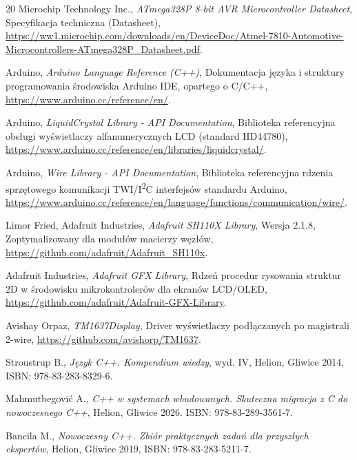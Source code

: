 \documentclass{SGGW-thesis}
\begin{document}
\begin{thebibliography}{20}
  Microchip Technology Inc.,
  \emph{ATmega328P 8-bit AVR Microcontroller Datasheet}, Specyfikacja techniczna (Datasheet), \url{https://ww1.microchip.com/downloads/en/DeviceDoc/Atmel-7810-Automotive-Microcontrollers-ATmega328P_Datasheet.pdf}.
  
  Arduino,
  \emph{Arduino Language Reference (C++)},
  Dokumentacja języka i struktury programowania środowiska Arduino IDE, opartego o C/C++,
  \url{https://www.arduino.cc/reference/en/}.
  
  Arduino,
  \emph{LiquidCrystal Library - API Documentation},
  Biblioteka referencyjna obsługi wyświetlaczy alfanumerycznych LCD (standard HD44780),
  \url{https://www.arduino.cc/reference/en/libraries/liquidcrystal/}.
  
  Arduino,
  \emph{Wire Library - API Documentation},
  Biblioteka referencyjna rdzenia sprzętowego komunikacji TWI/I\textsuperscript{2}C interfejsów standardu Arduino, \url{https://www.arduino.cc/reference/en/language/functions/communication/wire/}.
  
  Limor Fried, Adafruit Industries,
  \emph{Adafruit SH110X Library},
  Wersja 2.1.8, Zoptymalizowany dla modułów macierzy węzłów, \url{https://github.com/adafruit/Adafruit_SH110x}.
  
  Adafruit Industries,
  \emph{Adafruit GFX Library},
  Rdzeń procedur rysowania struktur 2D w środowisku mikrokontrolerów dla ekranów LCD/OLED,
  \url{https://github.com/adafruit/Adafruit-GFX-Library}.
  
  Avishay Orpaz,
  \emph{TM1637Display},
  Driver wyświetlaczy podłączanych po magistrali 2-wire,
  \url{https://github.com/avishorp/TM1637}.

  Stroustrup B.,
  \emph{Język C++. Kompendium wiedzy}, wyd. IV, Helion, Gliwice 2014,
  ISBN: 978-83-283-8329-6.

  Mahmutbegović A.,
  \emph{C++ w systemach wbudowanych. Skuteczna migracja z C do nowoczesnego C++}, Helion, Gliwice 2026.
  ISBN: 978-83-289-3561-7.

  Bancila M.,
  \emph{Nowoczesny C++. Zbiór praktycznych zadań dla przyszłych ekspertów}, Helion, Gliwice 2019,
  ISBN: 978-83-283-5211-7.


\end{thebibliography}
\end{document}
